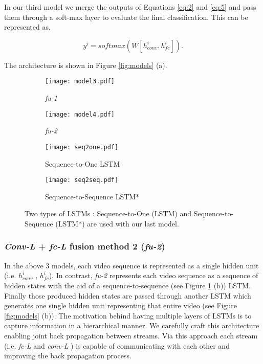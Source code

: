 \documentclass[10pt,twocolumn,letterpaper]{article}
\begin{document}
In our third model we merge the outputs of Equations \ref{eq:2} and \ref{eq:5} and pass them through a soft-max layer to evaluate the final classification. This can be represented as,

\begin{equation}
y^i=softmax( W [h^i_{conv},h^i_{fc}] ).
\label{eq:7}
\end{equation}

The architecture is shown in Figure \ref{fig:models} (a).

\begin{figure}[t!]
    \centering
    \begin{subfigure}{.45\columnwidth}
        \texttt{[image: model3.pdf]} %
        \caption{\textit{fu-1}}
    \end{subfigure}
    \begin{subfigure}{.45\columnwidth}
        \texttt{[image: model4.pdf]}
        \caption{\textit{fu-2}}
         \end{subfigure}
         \vspace{-3 mm}
         \caption{Simplified diagrams of last two models \textit{fu-1} (left) and \textit{fu-2} (right)} 
          \label{fig:models}
    \begin{subfigure}{.9\columnwidth}
        \texttt{[image: seq2one.pdf]} %
        \vspace{-5 mm}
        \caption{Sequence-to-One LSTM}
    \end{subfigure}
    \begin{subfigure}{.9\columnwidth}
        \texttt{[image: seq2seq.pdf]}
        \vspace{-2 mm}
        \caption{Sequence-to-Sequence LSTM*}
         \end{subfigure}

         \caption{Two types of LSTMs : Sequence-to-One (LSTM) and Sequence-to-Sequence (LSTM*) are used with our last model. }
        \label{fig:lstms}
\end{figure}

\subsubsection{\textit{Conv-L} + \textit{fc-L} fusion method 2 (\textit{fu-2})}

In the above 3 models, each video sequence is represented as a single hidden unit (i.e. $h^i_{conv}$ , $h^i_{fc}$). In contrast, \textit{fu-2} represents each video sequence as a sequence of hidden states with the aid of a sequence-to-sequence (see Figure \ref{fig:lstms} (b)) LSTM. Finally those produced hidden states are passed through another LSTM which generates one single hidden unit representing that entire video (see Figure \ref{fig:models} (b)). The motivation behind having multiple layers of LSTMs is to capture information in a hierarchical manner. We carefully craft this architecture enabling joint back propagation between streams. Via this approach each stream (i.e. \textit{fc-L} and \textit{conv-L} ) is capable of communicating with each other and improving the back propagation process. 
\end{document}
